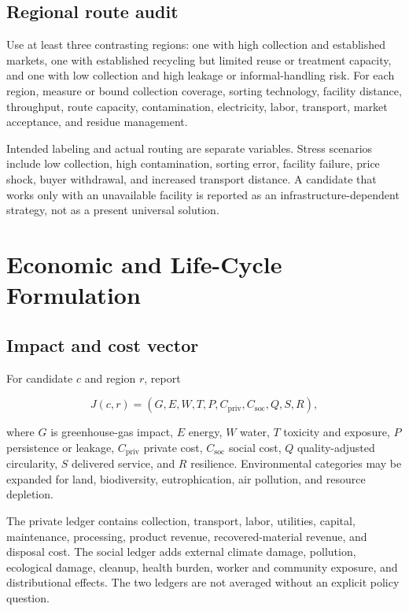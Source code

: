 \documentclass[conference]{IEEEtran}
\begin{document}
\subsection{Regional route audit}

Use at least three contrasting regions: one with high collection and established markets, one with established recycling but limited reuse or treatment capacity, and one with low collection and high leakage or informal-handling risk. For each region, measure or bound collection coverage, sorting technology, facility distance, throughput, route capacity, contamination, electricity, labor, transport, market acceptance, and residue management.

Intended labeling and actual routing are separate variables. Stress scenarios include low collection, high contamination, sorting error, facility failure, price shock, buyer withdrawal, and increased transport distance. A candidate that works only with an unavailable facility is reported as an infrastructure-dependent strategy, not as a present universal solution.

\section{Economic and Life-Cycle Formulation}

\subsection{Impact and cost vector}

For candidate $c$ and region $r$, report

\begin{equation}
J(c,r)=\left(G,E,W,T,P,C_{\mathrm{priv}},C_{\mathrm{soc}},Q,S,R\right),
\label{eq:objective}
\end{equation}

where $G$ is greenhouse-gas impact, $E$ energy, $W$ water, $T$ toxicity and exposure, $P$ persistence or leakage, $C_{\mathrm{priv}}$ private cost, $C_{\mathrm{soc}}$ social cost, $Q$ quality-adjusted circularity, $S$ delivered service, and $R$ resilience. Environmental categories may be expanded for land, biodiversity, eutrophication, air pollution, and resource depletion.

The private ledger contains collection, transport, labor, utilities, capital, maintenance, processing, product revenue, recovered-material revenue, and disposal cost. The social ledger adds external climate damage, pollution, ecological damage, cleanup, health burden, worker and community exposure, and distributional effects. The two ledgers are not averaged without an explicit policy question.
\end{document}
